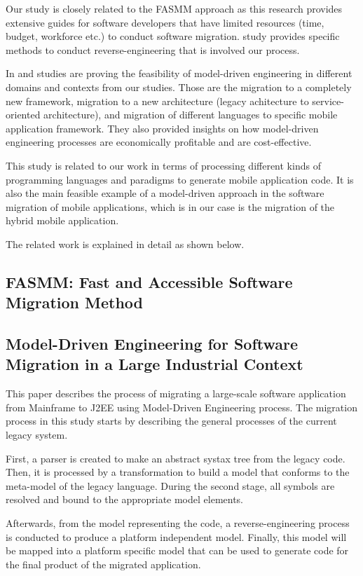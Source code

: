 \documentclass[conference]{IEEEtran}
\begin{document}
Our study is closely related to the FASMM approach \cite{b3} as this research
provides extensive guides for software developers that have limited 
resources (time, budget, workforce etc.) to conduct software migration. 
\cite{b4} study provides specific methods to conduct reverse-engineering 
that is involved our process.

In \cite{b5} and \cite{b6} studies are proving the feasibility of model-driven engineering
in different domains and contexts from our studies. Those are the migration to a completely new framework, 
migration to a new architecture (legacy achitecture to service-oriented architecture), and migration
of different languages to specific mobile application framework. 
They also provided insights on how model-driven engineering processes are economically
profitable and are cost-effective. 

This \cite{b2} study is related to our work in terms of processing different kinds of 
programming languages and paradigms to generate mobile application code. It is also 
the main feasible example of a model-driven approach in the software migration of mobile applications,
which is in our case is the migration of the hybrid mobile application.

The related work is explained in detail as shown below. 

\subsection{ FASMM: Fast and Accessible Software Migration Method }

\subsection{ Model-Driven Engineering for Software Migration in a Large Industrial Context }
This paper describes the process of migrating a large-scale software application from Mainframe to J2EE
using Model-Driven Engineering process. The migration process in this study starts by describing the general 
processes of the current legacy system.

First, a parser is created to make an abstract systax tree from the legacy code. Then, it is processed
by a transformation to build a model that conforms to the meta-model of the legacy language.
During the second stage, all symbols are resolved and bound to the appropriate model elements.

Afterwards, from the model representing the code, a reverse-engineering process is conducted to produce a platform independent 
model. Finally, this model will be mapped into a platform specific model that can be used to generate code
for the final product of the migrated application. 
\end{document}
